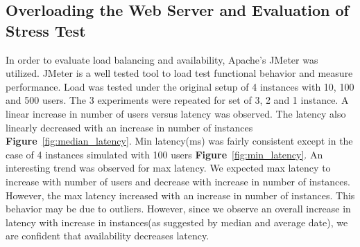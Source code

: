 \documentclass[12pt]{article}
\begin{document}
\subsection{Overloading the Web Server and Evaluation of Stress Test} In order to 
evaluate load balancing and availability, Apache's JMeter was utilized. JMeter 
is a well tested tool to load test functional behavior and measure 
performance\cite{apache}. Load was tested under the original setup of 4 instances 
with 10, 100 and 500 users. The 3
experiments were repeated for set of 3, 2 and 1 instance. A linear increase in
number of users versus latency was observed. The latency also linearly decreased
with an increase in number of instances \textbf{Figure}~\ref{fig:median_latency}. Min
latency(ms) was fairly consistent except in the case of 4 instances simulated
with 100 users \textbf{Figure}~\ref{fig:min_latency}. An interesting trend was observed for max
latency. We expected max latency to increase with number of users and decrease
with increase in number of instances. However, the max latency increased with an
increase in number of instances. This behavior may be due to outliers. However,
since we observe an overall increase in latency with increase in instances(as
suggested by median and average date), we are confident that availability
decreases latency.  
\end{document}
